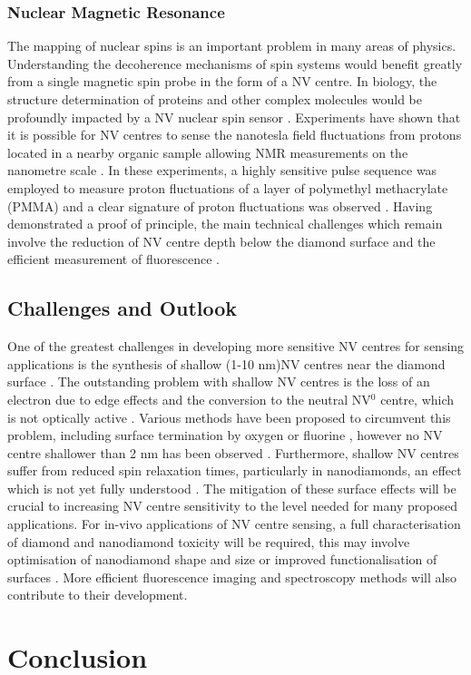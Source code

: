 \documentclass[10pt]{article}
\begin{document}
\begin{multicols}{2}
\subsubsection{Nuclear Magnetic Resonance}
The mapping of nuclear spins is an important problem in many areas of physics. Understanding the decoherence mechanisms of spin systems would benefit greatly from a single magnetic spin probe in the form of a NV centre. In biology, the structure determination of proteins and other complex molecules would be profoundly impacted by a NV nuclear spin sensor \cite{schirhagl2014nitrogen}. Experiments have shown that it is possible for NV centres to sense the nanotesla field fluctuations from protons located in a nearby organic sample allowing NMR measurements on the nanometre scale \cite{mamin2013nanoscale}. In these experiments, a highly sensitive pulse sequence was employed to measure proton fluctuations of a layer of polymethyl methacrylate (PMMA) and a clear signature of proton fluctuations was observed \cite{mamin2013nanoscale}. Having demonstrated a proof of principle, the main technical challenges which remain involve the reduction of NV centre depth below the diamond surface and the efficient measurement of fluorescence \cite{mamin2013nanoscale}. 


\subsection{Challenges and Outlook}
One of the greatest challenges in developing more sensitive NV centres for sensing applications is the synthesis of shallow (1-10 nm)NV centres near the diamond surface \cite{schirhagl2014nitrogen}. The outstanding problem with shallow NV centres is the loss of an electron due to edge effects and the conversion to the neutral NV$^0$ centre, which is not optically active \cite{schirhagl2014nitrogen}. Various methods have been proposed to circumvent this problem, including surface termination by oxygen or fluorine \cite{cui2013increased,fu2010conversion}, however no NV centre shallower than 2 nm has been observed \cite{schirhagl2014nitrogen}. Furthermore, shallow NV centres suffer from reduced spin relaxation times, particularly in nanodiamonds, an effect which is not yet fully understood \cite{schirhagl2014nitrogen}. The mitigation of these surface effects will be crucial to increasing NV centre sensitivity to the level needed for many proposed applications. For in-vivo applications of NV centre sensing, a full characterisation of diamond and nanodiamond toxicity will be required, this may involve optimisation of nanodiamond shape and size or improved functionalisation of surfaces \cite{wu2016diamond}. More efficient fluorescence imaging and spectroscopy methods will also contribute to their development. 

\section{Conclusion}{}
{}

\printbibliography

\end{multicols}
\end{document}
